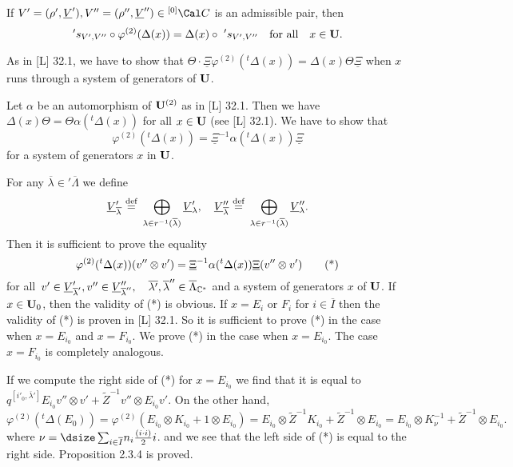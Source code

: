   If  $V' = (\rho', \underline{V}'), V'' =
(\rho'', \underline{V}'') \in {}^{[0]}{\Cal C}$  is an admissible pair, then
$$
's_{V',V''} \circ \varphi^{(2)} (\Delta(x)) = \Delta(x) \circ\
{}'s_{V',V''}\quad \text{for\ all}\quad x \in {\bold U}.
$$
\endproclaim

  As in [L] 32.1, we have to show that
$\Theta \cdot \underline{\Xi} \varphi^{(2)}({}^t\Delta(x)) = \Delta(x)
\Theta \underline{\Xi}$  when $x$ runs through a system of generators of
${\bold U}$.
\enddemo

Let $\alpha$  be an automorphism of  ${\bold U}^{(2)}$  as in [L] 32.1.  Then
we have
$\Delta(x)\Theta = \Theta\alpha({}^t\Delta(x))$  for all $x \in {\bold U}$ (see
[L] 32.1).   We have to show that
$$
\varphi^{(2)}({}^t\Delta(x)) = \underline{\Xi}^{-1} \alpha({}^t\Delta(x))
\underline{\Xi}
$$
for a system of generators $x$ in ${\bold U}$.

For any  $\overline{\lambda} \in {}'\overline{\Lambda}$  we define
$$
\underline{V}'_{\overline{\lambda}}\ {\buildrel{\text{def}}\over =}\
\bigoplus_{\lambda \in r^{-1}(\overline{\lambda})}
\underline{V}'_\lambda,\quad
\underline{V}''_{\overline{\lambda}}\ {\buildrel{\text{def}}\over =}\
\bigoplus_{\lambda \in r^{-1}(\overline{\lambda})}
\underline{V}''_\lambda .
$$
Then it is sufficient to prove the equality
$$
\varphi^{(2)}({}^t\Delta(x))(v'' \otimes v') = \underline{\Xi}^{-1}
\alpha({}^t\Delta(x)) \underline{\Xi}(v'' \otimes v')
\tag *
$$
for all\ $v' \in \underline{V}'_{\overline{\lambda}'},
v'' \in \underline{V}''_{\overline{\lambda}''},\quad
\overline{\lambda'}, \overline{\lambda}'' \in \overline{\Lambda}_{{\Bbb C}^*}$
and a system of generators $x$ of ${\bold U}$.  If $x \in {\bold U}_0$, then
the
validity of (*) is obvious.  If  $x = E_i$ or $F_i$  for $i \in \overline{I}$
then the validity of (*) is proven in [L] 32.1.  So it is sufficient to prove
(*) in the case when $x = E_{i_0}$  and  $x = F_{i_0}$.  We prove (*) in the
case when  $x = E_{i_0}$.  The case  $x = F_{i_0}$  is completely analogous.

\subheading{2.3.6}  If we compute the right side of (*) for $x = E_{i_0}$  we
find that it is equal to  $q^{[i'_0,{\overline{\lambda}}']}
E_{i_0} v'' \otimes v' + \widetilde{Z}^{-1}v'' \otimes E_{i_0} v'$.  On the
other hand,
$$
\varphi^{(2)} ({}^t\Delta(E_0)) = \varphi^{(2)}(E_{i_0} \otimes K_{i_0} + 1
\otimes
E_{i_0}) = E_{i_0} \otimes \widetilde{Z}^{-1} K_{i_0} + \widetilde{Z}^{-1}
\otimes E_{i_0} = E_{i_0} \otimes K_\nu^{-1} + \widetilde{Z}^{-1} \otimes
E_{i_0}.
$$
where $\nu = {\dsize\sum_{i\in\overline{I}}} n_i {\frac{(i\cdot i)}{2}} i$.
and we see that the left side of (*) is equal to the right side.  Proposition
2.3.4
is proved.

